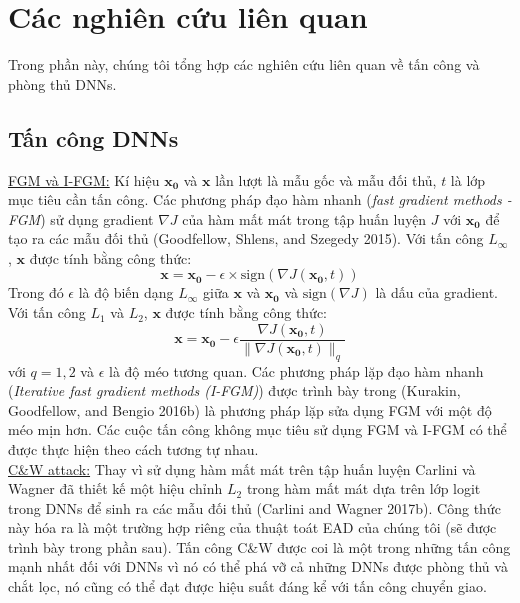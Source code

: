 \chapter{Các nghiên cứu liên quan}
Trong phần này, chúng tôi tổng hợp các nghiên cứu liên quan về tấn công và phòng thủ DNNs.

\section{Tấn công DNNs}
\underline{FGM và I-FGM:} Kí hiệu $\mathbf{x_0}$ và $\mathbf{x}$ lần lượt là mẫu gốc và mẫu đối thủ,
$t$ là lớp mục tiêu cần tấn công. Các phương pháp đạo hàm nhanh (\textit{fast gradient 
methods - FGM}) sử dụng gradient $\nabla J$ của hàm mất mát trong tập huấn luyện $J$ với $\mathbf{x_0}$
để tạo ra các mẫu đối thủ (Goodfellow, Shlens, and Szegedy 2015). Với tấn công $L_{\infty}$, 
$\mathbf{x}$ được tính bằng công thức:
\begin{equation}
    \mathbf{x} = \mathbf{x_0} - \epsilon \times \text{sign}(\nabla J(\mathbf{x_0}, t))
\end{equation}
Trong đó $\epsilon$ là độ biến dạng $L_{\infty}$ giữa $\mathbf{x}$ và $\mathbf{x_0}$ và 
$\text{sign}(\nabla J)$ là dấu của gradient. Với tấn công $L_1$ và $L_2$, $\mathbf{x}$ 
được tính bằng công thức:
\begin{equation}
    \mathbf{x} = \mathbf{x_0} - \epsilon \frac{\nabla J(\mathbf{x_0}, t)}
    {\lVert \nabla J(\mathbf{x_0}, t) \rVert _q}
\end{equation}
với $q = 1,2$ và $\epsilon$ là độ méo tương quan. Các phương pháp lặp đạo hàm nhanh 
(\textit{Iterative fast gradient methods (I-FGM)}) được trình bày trong (Kurakin, Goodfellow, 
and Bengio 2016b) là phương pháp lặp sửa dụng FGM với một độ méo mịn hơn. Các cuộc tấn công 
không mục tiêu sử dụng FGM và I-FGM có thể được thực hiện theo cách tương tự nhau. \\

\underline{C\&W attack:} Thay vì sử dụng hàm mất mát trên tập huấn luyện Carlini và Wagner
đã thiết kế  một hiệu chỉnh $L_2$ trong hàm mất mát dựa trên lớp logit trong DNNs để sinh 
ra các mẫu đối thủ (Carlini and Wagner 2017b). Công thức này hóa ra là một trường hợp riêng của 
thuật toát EAD của chúng tôi (sẽ được trình bày trong phần sau). Tấn công C\&W được coi 
là một trong những tấn công mạnh nhất đối với DNNs vì nó có thể phá vỡ cả những DNNs được 
phòng thủ và chắt lọc, nó cũng có thể đạt được hiệu suất đáng kể với tấn công chuyển giao.


